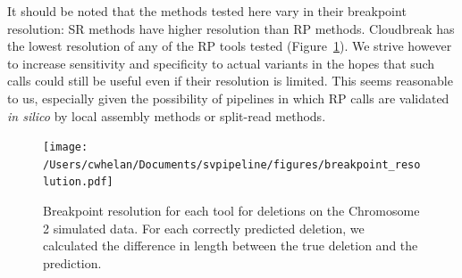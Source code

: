 It should be noted that the methods tested here vary in their breakpoint resolution: SR methods have higher resolution than RP methods. Cloudbreak has the lowest resolution of any of the RP tools tested (Figure~\ref{breakpoint_resolution}). We strive however to increase sensitivity and specificity to actual variants in the hopes that such calls could still be useful even if their resolution is limited. This seems reasonable to us, especially given the possibility of pipelines in which RP calls are validated \emph{in silico} by local assembly methods or split-read methods.

\begin{figure}
\centering
\texttt{[image: /Users/cwhelan/Documents/svpipeline/figures/breakpoint\_resolution.pdf]}
\caption{Breakpoint resolution for each tool for deletions on the Chromosome 2 simulated data. For each correctly predicted deletion, we calculated the difference in length between the true deletion and the prediction.}
\label{breakpoint_resolution}
\end{figure}

